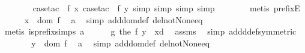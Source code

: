\begin{isabellebody}
\ \ \ \ \ \ \isamarkupfalse%
\ {\isacharparenleft}{\kern0pt}case{\isacharunderscore}{\kern0pt}tac\ {\isacharbrackleft}{\kern0pt}{\isacharbang}{\kern0pt}{\isacharbrackright}{\kern0pt}\ {\isachardoublequoteopen}f\ x{\isachardoublequoteclose}{\isacharcomma}{\kern0pt}\ case{\isacharunderscore}{\kern0pt}tac\ {\isacharbrackleft}{\kern0pt}{\isacharbang}{\kern0pt}{\isacharbrackright}{\kern0pt}\ {\isachardoublequoteopen}f\ y{\isachardoublequoteclose}{\isacharcomma}{\kern0pt}\ simp{\isacharcomma}{\kern0pt}\ simp{\isacharcomma}{\kern0pt}\ simp{\isacharcomma}{\kern0pt}\ simp{\isacharparenright}{\kern0pt}\isanewline
\ \ \ \ \ \ \isamarkupfalse%
\ {\isacharparenleft}{\kern0pt}metis\ prefixE{\isacharparenright}{\kern0pt}\isanewline
\ \ \ \ \isamarkupfalse%
\ {\isachardoublequoteopen}x\ {\isasymin}\ dom\ f{\isachardoublequoteclose}\ \isamarkupfalse%
\ a\ \isamarkupfalse%
\ {\isacharparenleft}{\kern0pt}simp\ add{\isacharcolon}{\kern0pt}dom{\isacharunderscore}{\kern0pt}def\ del{\isacharcolon}{\kern0pt}not{\isacharunderscore}{\kern0pt}None{\isacharunderscore}{\kern0pt}eq{\isacharparenright}{\kern0pt}\isanewline
\ \ \ \ \ \ \isamarkupfalse%
\ {\isacharparenleft}{\kern0pt}metis\ is{\isacharunderscore}{\kern0pt}prefix{\isachardot}{\kern0pt}simps{\isacharparenleft}{\kern0pt}{}{\isacharparenright}{\kern0pt}\ a{\isacharparenright}{\kern0pt}\isanewline
\ \ \ \ \isamarkupfalse%
\ {\isachardoublequoteopen}g\ {\isacharparenleft}{\kern0pt}the\ {\isacharparenleft}{\kern0pt}f\ y{\isacharparenright}{\kern0pt}{\isacharparenright}{\kern0pt}\ {\isacharequal}{\kern0pt}\ {\isacharparenleft}{\kern0pt}x{\isacharcomma}{\kern0pt}d{\isacharparenright}{\kern0pt}{\isachardoublequoteclose}\ \isamarkupfalse%
\ assms\ \isamarkupfalse%
\ {\isacharparenleft}{\kern0pt}simp\ add{\isacharcolon}{\kern0pt}d{\isacharunderscore}{\kern0pt}def{\isacharbrackleft}{\kern0pt}symmetric{\isacharbrackright}{\kern0pt}{\isacharparenright}{\kern0pt}\isanewline
\ \ \ \ \isamarkupfalse%
\ \isamarkupfalse%
\ {\isachardoublequoteopen}y\ {\isasymin}\ dom\ f{\isachardoublequoteclose}\ \isamarkupfalse%
\ a\ \isamarkupfalse%
\ {\isacharparenleft}{\kern0pt}simp\ add{\isacharcolon}{\kern0pt}dom{\isacharunderscore}{\kern0pt}def\ del{\isacharcolon}{\kern0pt}not{\isacharunderscore}{\kern0pt}None{\isacharunderscore}{\kern0pt}eq{\isacharparenright}{\kern0pt}\isanewline
\ \ \ \ \ \ \isamarkupfalse%

\end{isabellebody}
